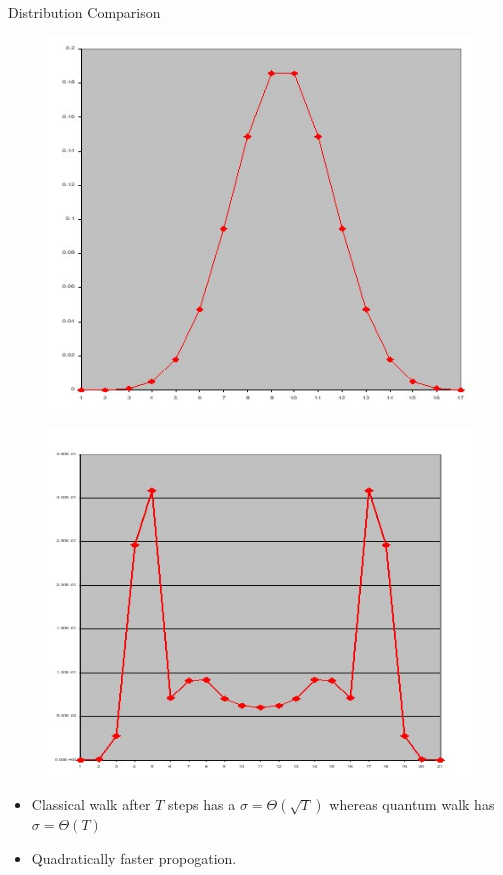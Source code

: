 \documentclass[10pt]{beamer}
\begin{document}
\begin{frame}{Distribution Comparison}
    \begin{figure}
\centering
\begin{minipage}{.5\textwidth}
  \centering
  \includegraphics[width=0.95\linewidth]{Images/ClassicalLRwalk.jpg}
  \label{fig:test1}
\end{minipage}%
\begin{minipage}{.5\textwidth}
  \centering
  \includegraphics[width=0.95\linewidth]{Images/QuantumLRwalk.jpg}
  \label{fig:test2}
\end{minipage}
\end{figure}
\begin{itemize}
    \item Classical walk after $T$ steps has a $\sigma = \Theta(\sqrt{T})$ whereas quantum walk has $\sigma = \Theta({T})$
    \item Quadratically faster propogation.
\end{itemize}
\end{frame}
\end{document}
